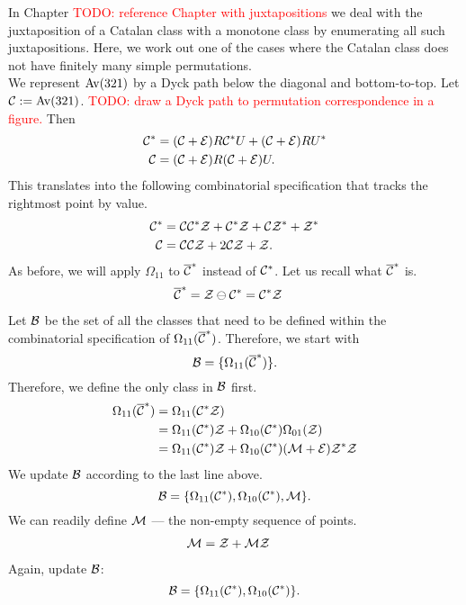 \documentclass[12pt, a4paper, twoside]{report}
\begin{document}
In Chapter \textcolor{red}{TODO: reference Chapter with juxtapositions} we deal with the juxtaposition of a Catalan class with a monotone class by enumerating all such juxtapositions. Here, we work out one of the cases where the Catalan class does not have finitely many simple permutations.\\

We represent $\mathrm{Av}(321)$ by a Dyck path below the diagonal and bottom-to-top. Let $\mathcal{C} := \mathrm{Av}(321)$. \textcolor{red}{TODO: draw a Dyck path to permutation correspondence in a figure.} Then
\begin{align*}
  \mathcal{C}^* &= (\mathcal{C} + \mathcal{E})R\mathcal{C}^*U + (\mathcal{C} + \mathcal{E})RU^*\\
  \mathcal{C} &= (\mathcal{C}+\mathcal{E})R(\mathcal{C}+\mathcal{E})U.
\end{align*}
This translates into the following combinatorial specification that tracks the rightmost point by value.
\begin{align*}
  \mathcal{C}^* &= \mathcal{C}\mathcal{C}^*\mathcal{Z} + \mathcal{C}^*\mathcal{Z} + \mathcal{C}\mathcal{Z}^* + \mathcal{Z}^*\\
  \mathcal{C} &= \mathcal{C}\mathcal{C}\mathcal{Z} + 2\mathcal{C}\mathcal{Z} + \mathcal{Z}.
\end{align*}
As before, we will apply $\Omega_{11}$ to $\overline{\mathcal{C}}^*$ instead of $\mathcal{C}^*$. Let us recall what $\overline{\mathcal{C}}^*$ is.
\begin{align*}
  \overline{\mathcal{C}}^* &= \mathcal{Z} \ominus \mathcal{C}^* = \mathcal{C}^*\mathcal{Z}
\end{align*}
Let $\mathcal{B}$ be the set of all the classes that need to be defined within the combinatorial specification of $\Omega_{11}(\overline{\mathcal{C}}^*)$. Therefore, we start with
$$\mathcal{B} = \{\Omega_{11}(\overline{\mathcal{C}}^*)\}.$$
Therefore, we define the only class in $\mathcal{B}$ first.
\begin{align}
  \begin{aligned}
  \Omega_{11}(\overline{\mathcal{C}}^*) &= \Omega_{11}(\mathcal{C}^*\mathcal{Z})\\
                         &= \Omega_{11}(\mathcal{C}^*)\mathcal{Z} + \Omega_{10}(\mathcal{C}^*)\Omega_{01}(\mathcal{Z})\\
                         &= \Omega_{11}(\mathcal{C}^*)\mathcal{Z} + \Omega_{10}(\mathcal{C}^*)(\mathcal{M}+\mathcal{E})\mathcal{Z}^*\mathcal{Z}\\
                       \end{aligned}
  \label{eq:omega11barCstar}
\end{align}
We update $\mathcal{B}$ according to the last line above.
$$\mathcal{B} = \{\Omega_{11}(\mathcal{C}^*), \Omega_{10}(\mathcal{C}^*), \mathcal{M}\}.$$
We can readily define $\mathcal{M}$ --- the non-empty sequence of points.
\begin{align}
  \mathcal{M} &= \mathcal{Z} + \mathcal{M}\mathcal{Z}
       \label{eq:M}
\end{align}
Again, update $\mathcal{B}$:
$$\mathcal{B} = \{\Omega_{11}(\mathcal{C}^*), \Omega_{10}(\mathcal{C}^*)\}.$$
\end{document}
